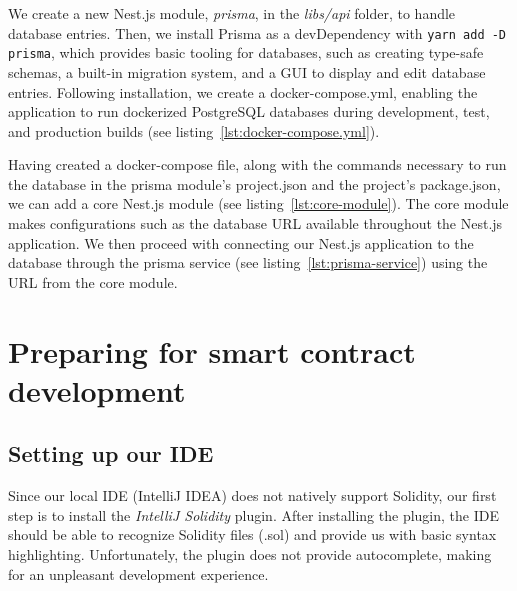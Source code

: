 We create a new Nest.js module, \emph{prisma}, in the \emph{libs/api} folder, to handle database entries.
Then, we install Prisma as a devDependency with \texttt{yarn add -D prisma}, which provides basic tooling for databases, such as creating type-safe schemas, a built-in migration system, and a \gls{GUI} to display and edit database entries.
Following installation, we create a docker-compose.yml, enabling the application to run dockerized PostgreSQL databases during development, test, and production builds (see listing~\ref{lst:docker-compose.yml}).


Having created a docker-compose file, along with the commands necessary to run the database in the prisma module’s project.json and the project’s package.json, we can add a core Nest.js module (see listing~\ref{lst:core-module}).
The core module makes configurations such as the database \gls{URL} available throughout the Nest.js application.
We then proceed with connecting our Nest.js application to the database through the prisma service (see listing~\ref{lst:prisma-service}) using the \gls{URL} from the core module.


\section{Preparing for smart contract development}\label{sec:preparing-for-smart-contract-development}

\subsection{Setting up our IDE}\label{subsec:setting-up-our-ide}

Since our local \gls{IDE} (IntelliJ IDEA) does not natively support Solidity, our first step is to install the \emph{IntelliJ Solidity} plugin.
After installing the plugin, the \gls{IDE} should be able to recognize Solidity files (.sol) and provide us with basic syntax highlighting.
Unfortunately, the plugin does not provide autocomplete, making for an unpleasant development experience.

